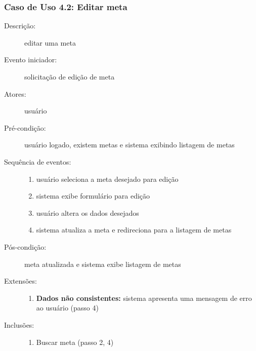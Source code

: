 \subsubsection{Caso de Uso 4.2: Editar meta}
\begin{description}
	\item[Descrição:] editar uma meta
	\item[Evento iniciador:] solicitação de edição de meta
	\item[Atores:] usuário
	\item[Pré-condição:] usuário logado, existem metas e sistema exibindo listagem de metas
	\item[Sequência de eventos:] \hfill
		\begin{enumerate}
			\item{usuário seleciona a meta desejado para edição}
			\item{sistema exibe formulário para edição}
			\item{usuário altera os dados desejados}
			\item{sistema atualiza a meta e redireciona para a listagem de metas}
		\end{enumerate}
	\item[Pós-condição:] meta atualizada e sistema exibe listagem de metas
	\item[Extensões:] \hfill
		\begin{enumerate}
			\item{\textbf{Dados não consistentes:} sistema apresenta uma mensagem de erro ao usuário (passo 4)}
		\end{enumerate}
	\item[Inclusões:] \hfill
		\begin{enumerate}
			\item{Buscar meta (passo 2, 4)}
		\end{enumerate}
\end{description}
%
